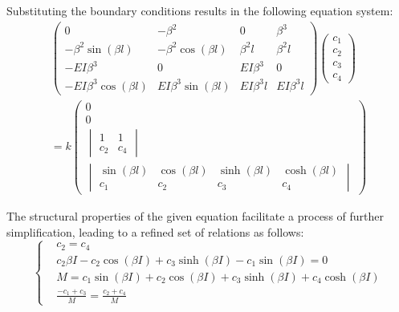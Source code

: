 \documentclass[conference]{IEEEtran}
\begin{document}
Substituting the boundary conditions results in the following equation system:
\begin{equation}
\begin{aligned}
\begin{pmatrix}
0 & -\beta^2 & 0 & \beta^3 \\
-\beta^2 \sin(\beta l) & -\beta^2 \cos(\beta l) & \beta^2 l & \beta^2 l \\
-EI\beta^3 & 0 & EI\beta^3 & 0 \\
-EI\beta^3 \cos(\beta l) & EI\beta^3 \sin(\beta l) & EI\beta^3 l & EI\beta^3 l
\end{pmatrix}
\begin{pmatrix}
c_1 \\
c_2 \\
c_3 \\
c_4
\end{pmatrix}
\\=k
\begin{pmatrix}
0 \\
0 \\
 \begin{vmatrix} 1 & 1 \\ c_2 & c_4 \end{vmatrix} \\
 \begin{vmatrix}
\sin(\beta l) & \cos(\beta l) & \sinh(\beta l) & \cosh(\beta l) \\
c_1 & c_2 & c_3 & c_4
\end{vmatrix}
\end{pmatrix}
\end{aligned}
\end{equation}

The structural properties of the given equation facilitate a process of further simplification, leading to a refined set of relations as follows:
\begin{equation}
\left\{
\begin{aligned}
& c_2 = c_4 \\
& c_2 \beta I - c_2 \cos(\beta I) + c_3 \sinh(\beta I) - c_1 \sin(\beta I) = 0 \\
& M=c_1 \sin(\beta I) + c_2 \cos(\beta I) + c_3 \sinh(\beta I) + c_4 \cosh(\beta I)\\
& \frac{-c_1 + c_3}{M} = \frac{c_2 + c_4}{M}
\end{aligned}
\right.
\end{equation}
\end{document}
